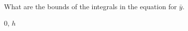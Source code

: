 What are the bounds of the integrals in the equation for $\bar{y}$.

\begin{solution}
    0, $h$
\end{solution}